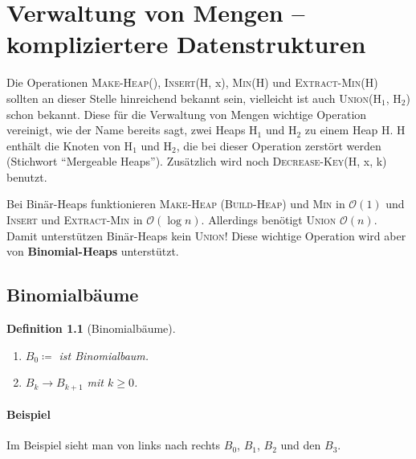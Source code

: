 \documentclass[ngerman,draft,parskip=half*,twoside]{scrreprt}
\theoremstyle{break}
\newtheorem{definition}{Definition}[chapter]
\theoremstyle{nonumberbreak}
\newcommand*{\OO}{\mathcal{O}}      %
\begin{document}
\chapter{Verwaltung von Mengen -- kompliziertere Datenstrukturen}
Die Operationen \textsc{Make-Heap}(), \textsc{Insert}(H, x), \textsc{Min}(H) und \textsc{Extract-Min}(H) sollten an dieser Stelle
hinreichend bekannt sein, vielleicht ist auch \textsc{Union}(H$_1$, H$_2$) schon bekannt. Diese für die Verwaltung von Mengen wichtige
Operation vereinigt, wie der Name bereits sagt, zwei Heaps H$_1$ und H$_2$ zu einem Heap H. H enthält die Knoten von H$_1$ und H$_2$,
die bei dieser Operation zerstört werden (Stichwort "`Mergeable Heaps"'). Zusätzlich wird noch \textsc{Decrease-Key}(H, x, k) benutzt.

Bei Binär-Heaps funktionieren \textsc{Make-Heap} (\textsc{Build-Heap}) und \textsc{Min} in $\OO(1)$ und \textsc{Insert} und
\textsc{Extract-Min} in $\OO(\log n)$. Allerdings benötigt \textsc{Union} $\OO(n)$. Damit unterstützen Binär-Heaps kein \textsc{Union}!
Diese wichtige Operation wird aber von \textbf{Binomial-Heaps} unterstützt.

\section{Binomialbäume}
\begin{definition}[Binomialbäume]
\begin{enumerate}
\item $B_0\coloneqq$   ist Binomialbaum.
\item $B_k\rightarrow B_{k+1}$ mit $k\geq0$.
  \begin{figure}[H]
  \centering
   
  
  \end{figure}
\end{enumerate}
\end{definition}
\subsubsection{Beispiel}
\begin{figure}[H]
  \centering
   
  
  \end{figure}
  Im Beispiel sieht man von links nach rechts $B_0$, $B_1$, $B_2$ und den $B_3$.
\end{document}
